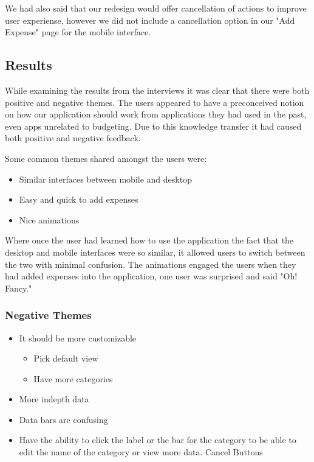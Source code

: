 \documentclass{chi2011}
\begin{document}
	We had also said that our redesign would offer cancellation of actions to improve user experiense,
	however we did not include a cancellation option in our "Add Expense" page for the mobile interface.

	\subsection{Results}

	While examining the results from the interviews it was clear that there were both positive and 
	negative themes. The users appeared to have a preconceived notion on how our application should
	work from applications they had used in the past, even apps unrelated to budgeting. Due to this
	knowledge transfer it had caused both positive and negative feedback. 
	
	Some common themes shared amongst the users were:
	\begin{itemize}[noitemsep]
		\item Similar interfaces between mobile and desktop
		\item Easy and quick to add expenses
		\item Nice animations
	\end{itemize}
	Where once the user had learned how to use the application the fact that the desktop and mobile
	interfaces were so similar, it allowed users to switch between the two with minimal confusion. 
	The animations engaged the users when they had added expenses into the application, one user
	was surprised and said "Oh! Fancy." 
	
	\subsubsection{Negative Themes}
	\begin{itemize}[noitemsep]
		\item It should be more customizable
		\begin{itemize}[noitemsep]
			\item Pick default view
			\item Have more categories
		\end{itemize}
		\item More indepth data 
		\item Data bars are confusing
		\item Have the ability to click the label or the bar for the category to be able to edit 
		the name of the category or view more data. Cancel Buttons
	\end{itemize}
	
\end{document}
